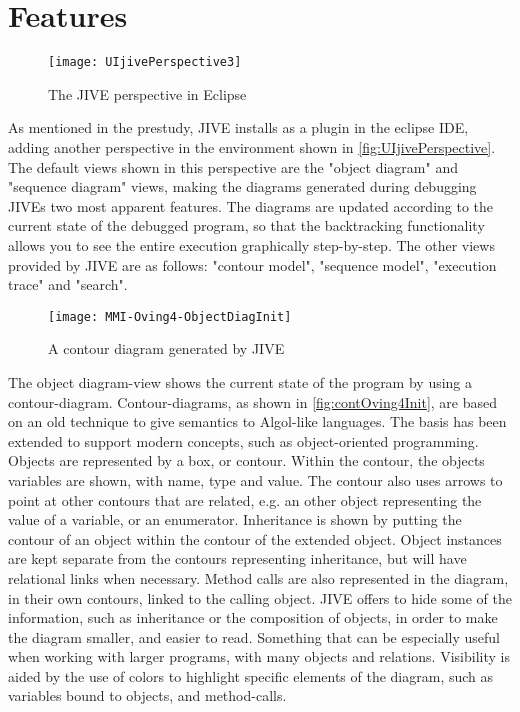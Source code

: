 \section{Features}\label{jiveFeatures}

\begin{figure}[H]
	\centering
	\texttt{[image: UIjivePerspective3]}
	\caption{The JIVE perspective in Eclipse}
	\label{fig:UIjivePerspective}
\end{figure}
As mentioned in the prestudy, JIVE installs as a plugin in the eclipse IDE, adding another perspective in the environment shown in \autoref{fig:UIjivePerspective}.
The default views shown in this perspective are the "object diagram" and "sequence diagram" views, making the diagrams generated during debugging JIVEs two most apparent features.
The diagrams are updated according to the current state of the debugged program, so that the backtracking functionality allows you to see the entire execution graphically step-by-step.
The other views provided by JIVE are as follows: "contour model", "sequence model", "execution trace" and "search".
~\\

\begin{figure}[H]
	\centering
	\texttt{[image: MMI-Oving4-ObjectDiagInit]}
	\caption{A contour diagram generated by JIVE}
	\label{fig:contOving4Init}
\end{figure}
The object diagram-view shows the current state of the program by using a contour-diagram.
Contour-diagrams, as shown in \autoref{fig:contOving4Init}, are based on an old technique to give semantics to Algol-like languages.
The basis has been extended to support modern concepts, such as object-oriented programming.
Objects are represented by a box, or contour.
Within the contour, the objects variables are shown, with name, type and value.
The contour also uses arrows to point at other contours that are related, e.g. an other object representing the value of a variable, or an enumerator.
Inheritance is shown by putting the contour of an object within the contour of the extended object. 
Object instances are kept separate from the contours representing inheritance, but will have relational links when necessary.
Method calls are also represented in the diagram, in their own contours, linked to the calling object.
JIVE offers to hide some of the information, such as inheritance or the composition of objects, in order to make the diagram smaller, and easier to read.
Something that can be especially useful when working with larger programs, with many objects and relations.
Visibility is aided by the use of colors to highlight specific elements of the diagram, such as variables bound to objects, and method-calls.
~\\


